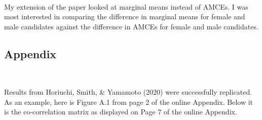 \documentclass[
]{article}
\begin{document}
~

My extension of the paper looked at marginal means instead of AMCEs. I was most interested in comparing the difference in marginal means for female and male candidates against the difference in AMCEs for female and male candidates.

\hypertarget{appendix}{%
\subsection{Appendix}\label{appendix}}

~

Results from Horiuchi, Smith, \& Yamamoto (2020) were successfully replicated. As an example, here is Figure A.1 from page 2 of the online Appendix. Below it is the co-correlation matrix as displayed on Page 7 of the online Appendix.
\end{document}
